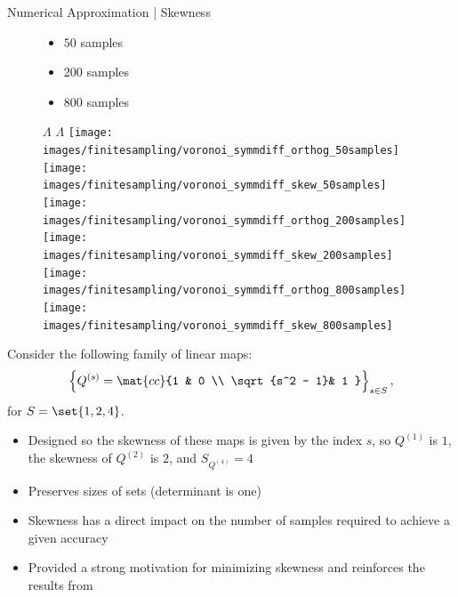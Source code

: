 \begin{frame}[t]{Numerical Approximation | Skewness}
\vspace{-10pt}
\begin{figure}
	\begin{minipage}{.3\textwidth}
		\begin{itemize}
			\item $50$ samples
			\vskip 60pt
			\item $200$ samples
			\vskip 60pt
			\item $800$ samples
		\end{itemize}
	\end{minipage}
	\begin{minipage}{.55\textwidth}
		\centering
    		$\Lambda$ \hskip 80pt $\Lambda$
    		\vskip 0pt
    		\texttt{[image: images/finitesampling/voronoi\_symmdiff\_orthog\_50samples]}
			\texttt{[image: images/finitesampling/voronoi\_symmdiff\_skew\_50samples]}\\
		\texttt{[image: images/finitesampling/voronoi\_symmdiff\_orthog\_200samples]}
			\texttt{[image: images/finitesampling/voronoi\_symmdiff\_skew\_200samples]}\\
		\texttt{[image: images/finitesampling/voronoi\_symmdiff\_orthog\_800samples]}
			\texttt{[image: images/finitesampling/voronoi\_symmdiff\_skew\_800samples]}\\
	\end{minipage}
\end{figure}

\end{frame}

\begin{frame}[t]
\begin{example}
\label{ex:skewness}
Consider the following family of linear maps:
\begin{equation}\label{eq:qmap2}
\left \lbrace Q^{(s)} =  \mat{cc}{1 & 0 \\ \sqrt{s^2 - 1}& 1 } \right \rbrace_{s\in S},
\end{equation}
for $S=\set{1,2,4}$. 
\begin{itemize}
	\item Designed so the skewness of these maps is given by the index $s$, so $Q^{(1)}$ is $1$, the skewness of $Q^{(2)}$ is $2$, and $S_{Q^{(4)}} = 4$
	\item Preserves sizes of sets (determinant is one)
	\item Skewness has a direct impact on the number of samples required to achieve a given accuracy
	\item Provided a strong motivation for minimizing skewness and reinforces the results from \cite{BPW_2015}
\end{itemize}
\end{example}

\end{frame}


